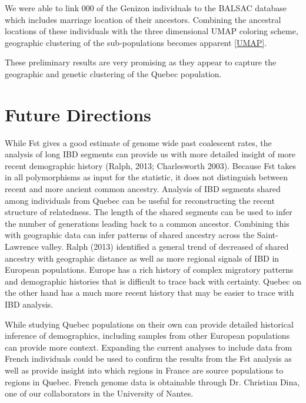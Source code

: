 \documentclass[
11pt, %
oneside, %
english, %
doublespacing, %
headsepline, %
]{MastersDoctoralThesis} %
\begin{document}
We were able to link 000 of the Genizon individuals to the BALSAC database which includes marriage location of their ancestors.
Combining the ancestral locations of these individuals with the three dimensional UMAP coloring scheme, geographic clustering of the sub-populations becomes apparent \ref{UMAP}.  

These preliminary results are very promising as they appear to capture the geographic and genetic clustering of the Quebec population.





\section{Future Directions}
While Fst gives a good estimate of genome wide past coalescent rates, the analysis of long IBD segments can provide us with more detailed insight of more recent demographic history (Ralph, 2013; Charlesworth 2003).
Because Fst takes in all polymorphisms as input for the statistic, it does not distinguish between recent and more ancient common ancestry.
Analysis of IBD segments shared among individuals from Quebec can be useful for reconstructing the recent structure of relatedness.
The length of the shared segments can be used to infer the number of generations leading back to a common ancestor.
Combining this with geographic data can infer patterns of shared ancestry across the Saint-Lawrence valley.
Ralph (2013) identified a general trend of decreased of shared ancestry with geographic distance as well as more regional signals of IBD in European populations.
Europe has a rich history of complex migratory patterns and demographic histories that is difficult to trace back with certainty. 
Quebec on the other hand has a much more recent history that may be easier to trace with IBD analysis.

While studying Quebec populations on their own can provide detailed historical inference of demographics, including samples from other European populations can provide more context.
Expanding the current analyses to include data from French individuals could be used to confirm the results from the Fst analysis as well as provide insight into which regions in France are source populations to regions in Quebec.
French genome data is obtainable through Dr. Christian Dina, one of our collaborators in the University of Nantes. 
\end{document}
